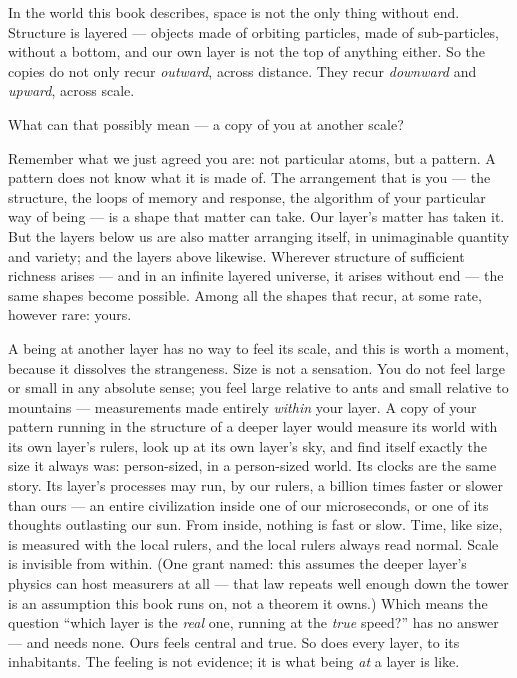 \documentclass[fontsize=11pt,paper=a4,pagesize=auto,parskip=half-]{scrbook}
\begin{document}
In the world this book describes, space is not the only thing without end. Structure is layered --- objects made of orbiting particles, made of sub-particles, without a bottom, and our own layer is not the top of anything either. So the copies do not only recur \emph{outward}, across distance. They recur \emph{downward} and \emph{upward}, across scale.

What can that possibly mean --- a copy of you at another scale?

Remember what we just agreed you are: not particular atoms, but a pattern. A pattern does not know what it is made of. The arrangement that is you --- the structure, the loops of memory and response, the algorithm of your particular way of being --- is a shape that matter can take. Our layer's matter has taken it. But the layers below us are also matter arranging itself, in unimaginable quantity and variety; and the layers above likewise. Wherever structure of sufficient richness arises --- and in an infinite layered universe, it arises without end --- the same shapes become possible. Among all the shapes that recur, at some rate, however rare: yours.

A being at another layer has no way to feel its scale, and this is worth a moment, because it dissolves the strangeness. Size is not a sensation. You do not feel large or small in any absolute sense; you feel large relative to ants and small relative to mountains --- measurements made entirely \emph{within} your layer. A copy of your pattern running in the structure of a deeper layer would measure its world with its own layer's rulers, look up at its own layer's sky, and find itself exactly the size it always was: person-sized, in a person-sized world. Its clocks are the same story. Its layer's processes may run, by our rulers, a billion times faster or slower than ours --- an entire civilization inside one of our microseconds, or one of its thoughts outlasting our sun. From inside, nothing is fast or slow. Time, like size, is measured with the local rulers, and the local rulers always read normal. Scale is invisible from within. (One grant named: this assumes the deeper layer's physics can host measurers at all --- that law repeats well enough down the tower is an assumption this book runs on, not a theorem it owns.) Which means the question ``which layer is the \emph{real} one, running at the \emph{true} speed?'' has no answer --- and needs none. Ours feels central and true. So does every layer, to its inhabitants. The feeling is not evidence; it is what being \emph{at} a layer is like.
\end{document}
